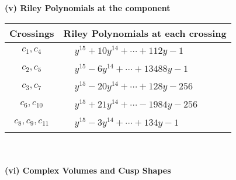 \documentclass[1p]{elsarticle_modified}
\theoremstyle{definition}
\begin{document}
\newpage\renewcommand{\arraystretch}{1}
\flushleft \textbf{(v) Riley Polynomials at the component}\newline \\
\begin{tabular}{m{50pt}|m{274pt}}
Crossings & \hspace{64pt}Riley Polynomials at each crossing \\
\hline $$\begin{aligned}c_{1},c_{4}\end{aligned}$$&$\begin{aligned}
&y^{15}+10 y^{14}+\cdots+112 y-1
\end{aligned}$\\
\hline $$\begin{aligned}c_{2},c_{5}\end{aligned}$$&$\begin{aligned}
&y^{15}-6 y^{14}+\cdots+13488 y-1
\end{aligned}$\\
\hline $$\begin{aligned}c_{3},c_{7}\end{aligned}$$&$\begin{aligned}
&y^{15}-20 y^{14}+\cdots+128 y-256
\end{aligned}$\\
\hline $$\begin{aligned}c_{6},c_{10}\end{aligned}$$&$\begin{aligned}
&y^{15}+21 y^{14}+\cdots-1984 y-256
\end{aligned}$\\
\hline $$\begin{aligned}c_{8},c_{9},c_{11}\end{aligned}$$&$\begin{aligned}
&y^{15}-3 y^{14}+\cdots+134 y-1
\end{aligned}$\\
\hline
\end{tabular}\\~\\
\newpage\flushleft \textbf{(vi) Complex Volumes and Cusp Shapes}
\end{document}
